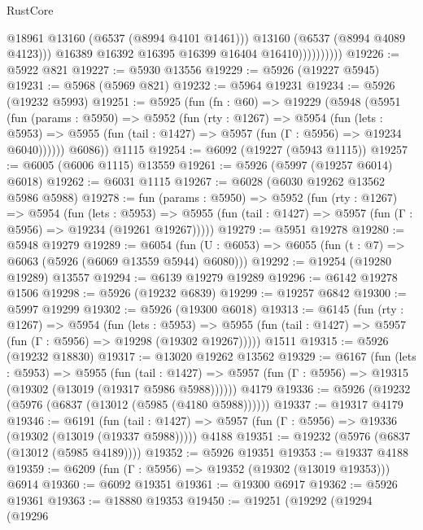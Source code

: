 \begin{lexlean}{RustCore}
\begin{coremodule}
                            @18961
                            @13160
                            (@6537 (@8994 @4101 @1461)))
                          @13160
                          (@6537 (@8994 @4089 @4123)))
                        @16389
                        @16392
                        @16395
                        @16399
                        @16404
                        @16410))))))))))
@19226 := @5922 @821
@19227 := @5930 @13556
@19229 := @5926 (@19227 @5945)
@19231 := @5968 (@5969 @821)
@19232 := @5964 @19231
@19234 := @5926 (@19232 @5993)
@19251 := @5925
    (fun (fn : @60) =>
    @19229
      (@5948
        (@5951
          (fun (params : @5950) =>
          @5952
            (fun (rty : @1267) =>
            @5954
              (fun (lets : @5953) =>
              @5955 (fun (tail : @1427) => @5957 (fun (Γ : @5956) => @19234 @6040))))))
        @6086))
    @1115
@19254 := @6092 (@19227 (@5943 @1115))
@19257 := @6005 (@6006 @1115) @13559
@19261 := @5926 (@5997 (@19257 @6014) @6018)
@19262 := @6031 @1115
@19267 := @6028 (@6030 @19262 @13562 @5986 @5988)
@19278 := fun (params : @5950) =>
  @5952
    (fun (rty : @1267) =>
    @5954
      (fun (lets : @5953) =>
      @5955 (fun (tail : @1427) => @5957 (fun (Γ : @5956) => @19234 (@19261 @19267)))))
@19279 := @5951 @19278
@19280 := @5948 @19279
@19289 := @6054
    (fun (U : @6053) => @6055 (fun (t : @7) => @6063 (@5926 (@6069 @13559 @5944) @6080)))
@19292 := @19254 (@19280 @19289) @13557
@19294 := @6139 @19279 @19289
@19296 := @6142 @19278 @1506
@19298 := @5926 (@19232 @6839)
@19299 := @19257 @6842
@19300 := @5997 @19299
@19302 := @5926 (@19300 @6018)
@19313 := @6145
    (fun (rty : @1267) =>
    @5954
      (fun (lets : @5953) =>
      @5955 (fun (tail : @1427) => @5957 (fun (Γ : @5956) => @19298 (@19302 @19267)))))
    @1511
@19315 := @5926 (@19232 @18830)
@19317 := @13020 @19262 @13562
@19329 := @6167
    (fun (lets : @5953) =>
    @5955
      (fun (tail : @1427) =>
      @5957 (fun (Γ : @5956) => @19315 (@19302 (@13019 (@19317 @5986 @5988))))))
    @4179
@19336 := @5926 (@19232 (@5976 (@6837 (@13012 (@5985 (@4180 @5988))))))
@19337 := @19317 @4179
@19346 := @6191
    (fun (tail : @1427) => @5957 (fun (Γ : @5956) => @19336 (@19302 (@13019 (@19337 @5988)))))
    @4188
@19351 := @19232 (@5976 (@6837 (@13012 (@5985 @4189))))
@19352 := @5926 @19351
@19353 := @19337 @4188
@19359 := @6209 (fun (Γ : @5956) => @19352 (@19302 (@13019 @19353))) @6914
@19360 := @6092 @19351
@19361 := @19300 @6917
@19362 := @5926 @19361
@19363 := @18880 @19353
@19450 := @19251
    (@19292
      (@19294
        (@19296

\end{coremodule}
\end{lexlean}
